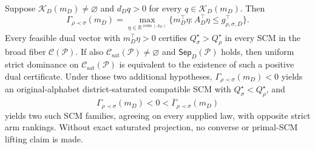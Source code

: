 Suppose \(\mathcal K_D(m_D)\ne\varnothing\) and \(d_Dq>0\) for every \(q\in\mathcal K_D(m_D)\). Then
\[
\Gamma_{\rho\prec\sigma}(m_D)
=\max_{\eta\in\mathbb R^{\operatorname{rows}(A_D)}}
\{m_D^\top\eta:A_D^\top\eta\le g_{\rho,\sigma,D}^\top\}.
\]
Every feasible dual vector with \(m_D^\top\eta>0\) certifies \(Q_\sigma^\star>Q_\rho^\star\) in every SCM in the broad fiber \(\mathcal C(\mathcal P)\). If also \(\mathcal C_{\mathrm{sat}}(\mathcal P)\ne\varnothing\) and \(\mathsf{Sep}_D(\mathcal P)\) holds, then uniform strict dominance on \(\mathcal C_{\mathrm{sat}}(\mathcal P)\) is equivalent to the existence of such a positive dual certificate. Under those two additional hypotheses, \(\Gamma_{\rho\prec\sigma}(m_D)<0\) yields an original-alphabet district-saturated compatible SCM with \(Q_\sigma^\star<Q_\rho^\star\), and
\[
\Gamma_{\rho\prec\sigma}(m_D)<0<\overline\Gamma_{\rho\prec\sigma}(m_D)
\]
yields two such SCM families, agreeing on every supplied law, with opposite strict arm rankings. Without exact saturated projection, no converse or primal-SCM lifting claim is made.